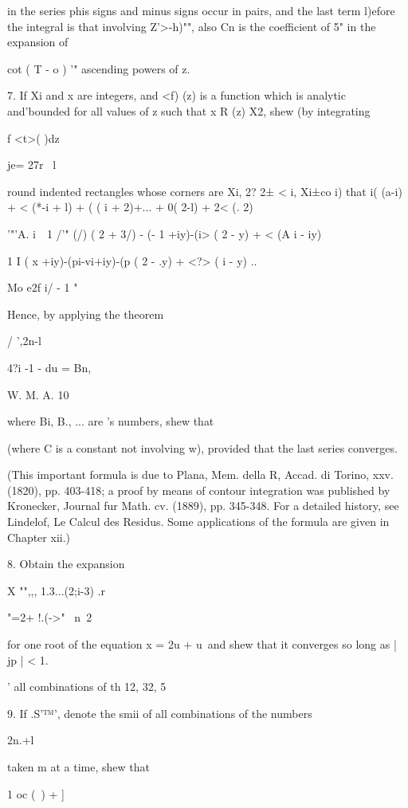 {{in the series phis signs and minus signs occur in pairs, and the last
term l)efore the integral is that involving Z'>-h)"", also Cn is the
coefficient of 5" in the expansion of

cot ( T - o ) '" ascending powers of z. 

7. If Xi and x are integers, and <f) (z) is a function which is
analytic and'bounded for all values of z such that x R (z) X2, shew
(by integrating

f <t>( )dz

je= 27r \ l

round indented rectangles whose corners are Xi, 2? 2± < i, Xi±co i)
that i( (a-i) + < (*-i + l) + ( ( i + 2)+... + 0( 2-l) + 2< (. 2)

'"'A. i~\, 1 /'" (/) ( 2 + 3/) - (- 1 +iy)-(i> ( 2 - y) + < (A i -
iy)

1 I ( x +iy)-(pi-vi+iy)-(p ( 2 - .y) + <?> ( i - y) ..

Mo e2f i/ - 1  "

Hence, by applying the theorem

/ ',2n-l

4?i -1 - du = Bn,

W. M. A. 10

%
%

where Bi, B., ... are \Bernoulli's numbers, shew that

(where C is a constant not involving w), provided that the last series
converges.

(This important formula is due to Plana, Mem. della R, Accad. di
Torino, xxv. (1820), pp. 403-418; a proof by means of contour
integration was published by Kronecker, Journal fur Math. cv. (1889),
pp. 345-348. For a detailed history, see Lindelof, Le Calcul des
Residus. Some applications of the formula are given in Chapter xii.)

8. Obtain the expansion

X "",,, 1.3...(2;i-3) .r

"=2+ !.(->"~ n\ 2

for one root of the equation x = 2u + u\ and shew that it converges so
long as | jp | < 1.

' all combinations of th 12, 32, 5%

9. If .S'™', denote the smii of all combinations of the numbers

2n.+l

taken m at a time, shew that

1 oc (\ ) + ]

}}

